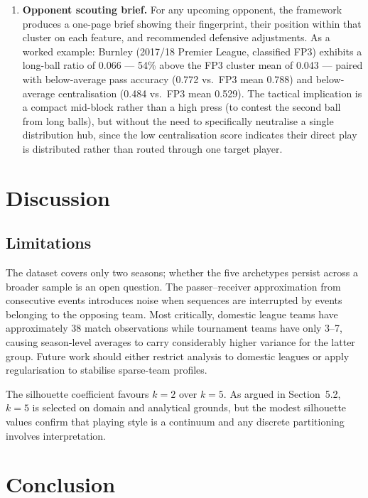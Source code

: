 \documentclass[runningheads]{llncs}
\begin{document}
\begin{enumerate}
    \item \textbf{Opponent scouting brief.} For any upcoming opponent, the framework produces a one-page brief showing their fingerprint, their position within that cluster on each feature, and recommended defensive adjustments. As a worked example: Burnley (2017/18 Premier League, classified FP3) exhibits a long-ball ratio of 0.066 --- 54\% above the FP3 cluster mean of 0.043 --- paired with below-average pass accuracy (0.772 vs.\ FP3 mean 0.788) and below-average centralisation (0.484 vs.\ FP3 mean 0.529). The tactical implication is a compact mid-block rather than a high press (to contest the second ball from long balls), but without the need to specifically neutralise a single distribution hub, since the low centralisation score indicates their direct play is distributed rather than routed through one target player.
\end{enumerate}

\section{Discussion}

\subsection{Limitations}

The dataset covers only two seasons; whether the five archetypes persist across a broader sample is an open question. The passer--receiver approximation from consecutive events introduces noise when sequences are interrupted by events belonging to the opposing team. Most critically, domestic league teams have approximately 38 match observations while tournament teams have only 3--7, causing season-level averages to carry considerably higher variance for the latter group. Future work should either restrict analysis to domestic leagues or apply regularisation to stabilise sparse-team profiles.

The silhouette coefficient favours $k = 2$ over $k = 5$. As argued in Section~5.2, $k = 5$ is selected on domain and analytical grounds, but the modest silhouette values confirm that playing style is a continuum and any discrete partitioning involves interpretation.

\section{Conclusion}
\end{document}
